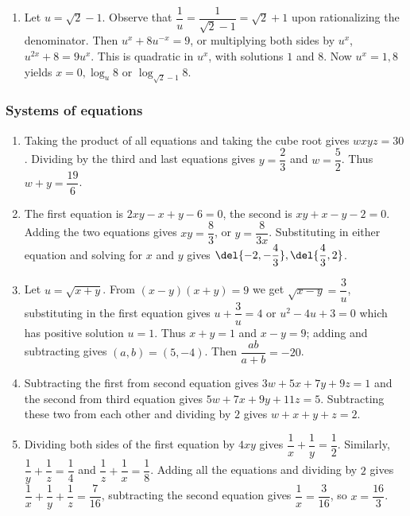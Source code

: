 \documentclass[10pt,paper=letter]{scrartcl}
\begin{document}
\begin{enumerate}
\item Let $u = \sqrt{2} - 1$. Observe that $\dfrac1u = \dfrac1{\sqrt2 - 1} = \sqrt2 + 1$ upon rationalizing the denominator. Then $u^x + 8u^{-x} = 9$, or multiplying both sides by $u^x$, $u^{2x} + 8 = 9u^x$. This is quadratic in $u^x$, with solutions $1$ and $8$. Now $u^x = 1, 8$ yields $x = 0, \log_u 8$ or $\log_{\sqrt2 - 1} 8$.

\end{enumerate}

\subsubsection*{Systems of equations}

\begin{enumerate}

\item Taking the product of all equations and taking the cube root gives $wxyz = 30$. Dividing by the third and last equations gives $y = \dfrac23$ and $w = \dfrac52$. Thus $w + y = \dfrac{19}6$.

\item The first equation is $2xy - x + y - 6 = 0$, the second is $xy + x - y - 2 = 0$. Adding the two equations gives $xy = \dfrac83$, or $y = \dfrac8{3x}$. Substituting in either equation and solving for $x$ and $y$ gives $\del{-2, -\dfrac43}, \del{\dfrac43, 2}$.

\item Let $u = \sqrt{x+y}$. From $(x-y)(x+y) = 9$ we get $\sqrt{x-y} = \dfrac3u$, substituting in the first equation gives $u + \dfrac3u = 4$ or $u^2 - 4u + 3 = 0$ which has positive solution $u = 1$. Thus $x + y = 1$ and $x - y = 9$; adding and subtracting gives $(a, b) = (5, -4)$. Then $\dfrac{ab}{a+b} = -20$.

\item Subtracting the first from second equation gives $3w + 5x + 7y + 9z = 1$ and the second from third equation gives $5w + 7x + 9y + 11z = 5$. Subtracting these two from each other and dividing by $2$ gives $w + x + y + z = 2$.

\item Dividing both sides of the first equation by $4xy$ gives $\dfrac1x + \dfrac1y = \dfrac12$. Similarly, $\dfrac1y + \dfrac1z = \dfrac14$ and $\dfrac1z + \dfrac1x = \dfrac18$. Adding all the equations and dividing by $2$ gives $\dfrac1x + \dfrac1y + \dfrac1z = \dfrac7{16}$, subtracting the second equation gives $\dfrac1x = \dfrac3{16}$, so $x = \dfrac{16}3$.

\end{enumerate}
\end{document}
